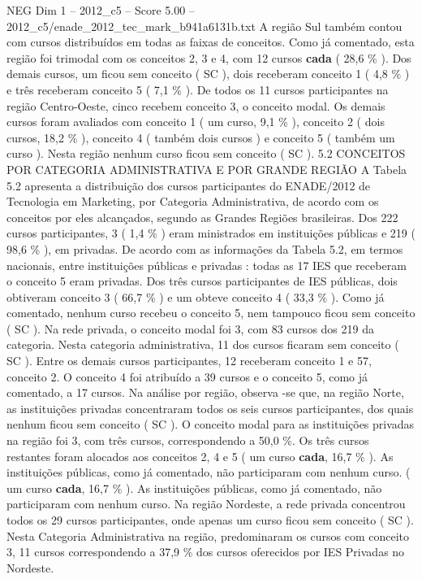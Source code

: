\begin{textsample}{NEG Dim 1 – 2012\_c5 – Score 5.00 – 2012\_c5/enade\_2012\_tec\_mark\_b941a6131b.txt}
A região Sul também contou com cursos distribuídos em todas as faixas de conceitos.
Como já comentado, esta região foi trimodal com os conceitos 2, 3 e 4, com 12 cursos \textbf{cada} ( 28,6 \% ).
Dos demais cursos, um ficou sem conceito ( SC ), dois receberam conceito 1 ( 4,8 \% ) e três receberam conceito 5 ( 7,1 \% ).
De todos os 11 cursos participantes na região Centro-Oeste, cinco recebem conceito 3, o conceito modal.
Os demais cursos foram avaliados com conceito 1 ( um curso, 9,1 \% ), conceito 2 ( dois cursos, 18,2 \% ), conceito 4 ( também dois cursos ) e conceito 5 ( também um curso ).
Nesta região nenhum curso ficou sem conceito ( SC ). 5.2 CONCEITOS POR CATEGORIA ADMINISTRATIVA E POR GRANDE REGIÃO A Tabela 5.2 apresenta a distribuição dos cursos participantes do ENADE/2012 de Tecnologia em Marketing, por Categoria Administrativa, de acordo com os conceitos por eles alcançados, segundo as Grandes Regiões brasileiras.
Dos 222 cursos participantes, 3 ( 1,4 \% ) eram ministrados em instituições públicas e 219 ( 98,6 \% ), em privadas.
De acordo com as informações da Tabela 5.2, em termos nacionais, entre instituições públicas e privadas : todas as 17 IES que receberam o conceito 5 eram privadas.
Dos três cursos participantes de IES públicas, dois obtiveram conceito 3 ( 66,7 \% ) e um obteve conceito 4 ( 33,3 \% ).
Como já comentado, nenhum curso recebeu o conceito 5, nem tampouco ficou sem conceito ( SC ).
Na rede privada, o conceito modal foi 3, com 83 cursos dos 219 da categoria.
Nesta categoria administrativa, 11 dos cursos ficaram sem conceito ( SC ).
Entre os demais cursos participantes, 12 receberam conceito 1 e 57, conceito 2.
O conceito 4 foi atribuído a 39 cursos e o conceito 5, como já comentado, a 17 cursos.
Na análise por região, observa -se que, na região Norte, as instituições privadas concentraram todos os seis cursos participantes, dos quais nenhum ficou sem conceito ( SC ).
O conceito modal para as instituições privadas na região foi 3, com três cursos, correspondendo a 50,0 \%.
Os três cursos restantes foram alocados aos conceitos 2, 4 e 5 ( um curso \textbf{cada}, 16,7 \% ).
As instituições públicas, como já comentado, não participaram com nenhum curso. ( um curso \textbf{cada}, 16,7 \% ).
As instituições públicas, como já comentado, não participaram com nenhum curso.
Na região Nordeste, a rede privada concentrou todos os 29 cursos participantes, onde apenas um curso ficou sem conceito ( SC ).
Nesta Categoria Administrativa na região, predominaram os cursos com conceito 3, 11 cursos correspondendo a 37,9 \% dos cursos oferecidos por IES Privadas no Nordeste.

\end{textsample}
